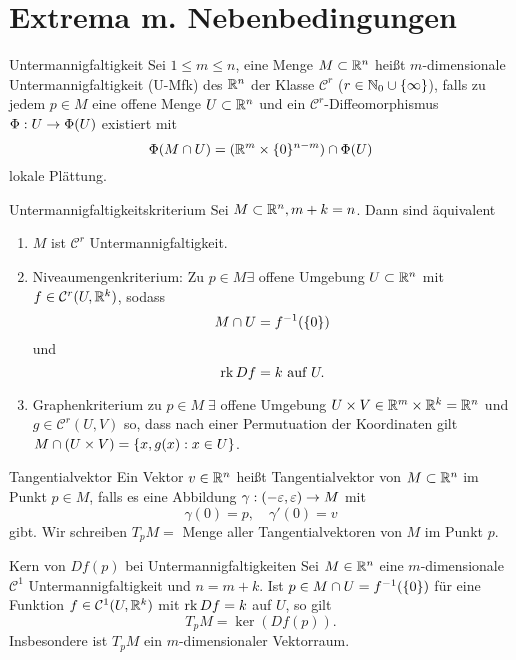 \documentclass[main.tex]{subfiles}
\begin{document}
\section*{Extrema m. Nebenbedingungen}

\begin{karte}{Untermannigfaltigkeit}
    Sei \( 1 \leq m \leq n \), eine Menge \( M \subset \mathbb{R}^n \) 
    heißt \(m\)-dimensionale Untermannigfaltigkeit 
    (U-Mfk) des \( \mathbb{R}^n \) der Klasse \( \mathcal{C}^r \) 
    (\(r \in \mathbb{N}_0 \cup \{\infty\} \)), falls zu jedem 
    \( p \in M \) eine offene Menge \( U \subset \mathbb{R}^n \) 
    und ein \( \mathcal{C}^r \)-Diffeomorphismus
    \(\Phi : U \rightarrow \Phi(U)\) existiert mit 
    \[ \Phi(M \cap U) = (\mathbb{R}^m \times \{0\}^{n-m}) \cap \Phi(U)\]
    lokale Plättung.
\end{karte}

\begin{karte}{Untermannigfaltigkeitskriterium}
    Sei \( M \subset \mathbb{R}^n, m + k = n \). Dann sind äquivalent
    \begin{enumerate}
        \item \(M\) ist \(\mathcal{C}^r \) Untermannigfaltigkeit.        
        \item Niveaumengenkriterium: Zu \( p \in M \exists \) offene 
        Umgebung \( U \subset \mathbb{R}^n \) mit 
        \( f \in \mathcal{C}^r(U, \mathbb{R}^k) \), sodass
        \[ M \cap U = f^{-1}(\{0\}) \]
        und
        \[ \operatorname{rk} Df = k \text{ auf } U. \]
        \item Graphenkriterium zu \(p \in M \; \exists \) offene
        Umgebung \(U \times V \in \mathbb{R}^m \times \mathbb{R}^k = \mathbb{R}^n\) und
        \(g \in \mathcal{C}^r (U, V)\) so, dass
        nach einer Permutuation der Koordinaten gilt \(M \cap (U \times V) 
        = \{x,g(x) : x \in U\}\).
    \end{enumerate}
\end{karte}

\begin{karte}{Tangentialvektor}
    Ein Vektor \(v \in \mathbb{R}^n\) heißt Tangentialvektor von \(M \subset \mathbb{R}^n\)
    im Punkt \(p \in M\), falls
    es eine Abbildung \( \gamma : (-\varepsilon, \varepsilon) \rightarrow M \) mit 
    \[ \gamma(0) = p, \quad \gamma'(0) = v \]
    gibt. Wir schreiben 
    \( T_p M = \) Menge aller Tangentialvektoren von \(M\) im Punkt \(p\).
\end{karte}

\begin{karte}{Kern von \( Df(p) \) bei Untermannigfaltigkeiten}
    Sei \( M \in \mathbb{R}^n \) eine \(m\)-dimensionale 
    \( \mathcal{C}^1 \) Untermannigfaltigkeit  und \(n = m + k\).
    Ist \( p \in M \cap U = f^{-1}(\{0\}) \) für eine
    Funktion \( f \in \mathcal{C}^1(U, \mathbb{R}^k) \) mit 
    \( \operatorname{rk} Df = k \) auf \(U\),
    so gilt 
    \[ T_p M = \ker(Df(p)). \]
    Insbesondere ist \( T_p M \) ein \(m\)-dimensionaler 
    Vektorraum.
\end{karte}
\end{document}
